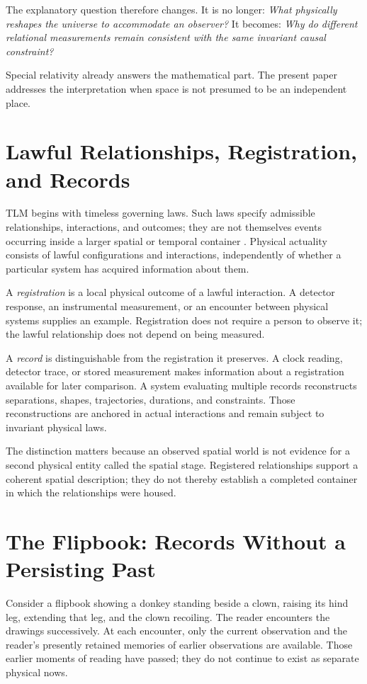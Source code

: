 \documentclass[11pt]{article}
\begin{document}
The explanatory question therefore changes. It is no longer: \emph{What physically reshapes the universe to accommodate an observer?} It becomes: \emph{Why do different relational measurements remain consistent with the same invariant causal constraint?}

Special relativity already answers the mathematical part. The present paper addresses the interpretation when space is not presumed to be an independent place.

\section{Lawful Relationships, Registration, and Records}

TLM begins with timeless governing laws. Such laws specify admissible relationships, interactions, and outcomes; they are not themselves events occurring inside a larger spatial or temporal container \cite{mckinleybox2026}. Physical actuality consists of lawful configurations and interactions, independently of whether a particular system has acquired information about them.

A \emph{registration} is a local physical outcome of a lawful interaction. A detector response, an instrumental measurement, or an encounter between physical systems supplies an example. Registration does not require a person to observe it; the lawful relationship does not depend on being measured.

A \emph{record} is distinguishable from the registration it preserves. A clock reading, detector trace, or stored measurement makes information about a registration available for later comparison. A system evaluating multiple records reconstructs separations, shapes, trajectories, durations, and constraints. Those reconstructions are anchored in actual interactions and remain subject to invariant physical laws.

The distinction matters because an observed spatial world is not evidence for a second physical entity called the spatial stage. Registered relationships support a coherent spatial description; they do not thereby establish a completed container in which the relationships were housed.

\section{The Flipbook: Records Without a Persisting Past}

Consider a flipbook showing a donkey standing beside a clown, raising its hind leg, extending that leg, and the clown recoiling. The reader encounters the drawings successively. At each encounter, only the current observation and the reader's presently retained memories of earlier observations are available. Those earlier moments of reading have passed; they do not continue to exist as separate physical nows.
\end{document}

